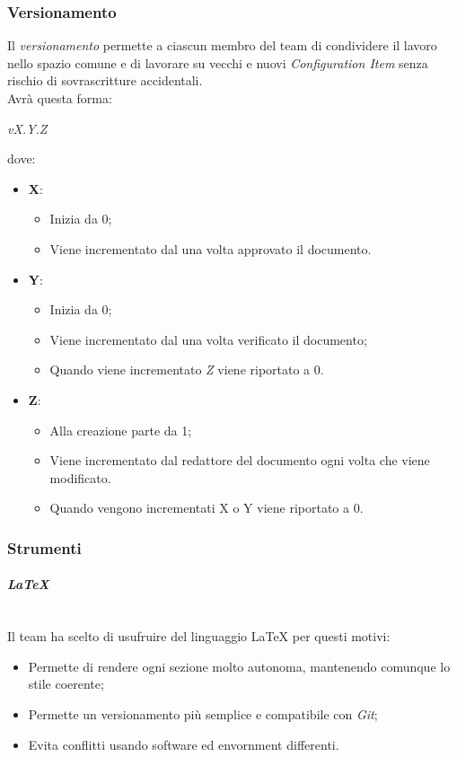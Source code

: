 	\subsubsection{Versionamento}
	Il \emph{versionamento} permette a ciascun membro del team di condividere il lavoro nello spazio comune e di lavorare su vecchi e nuovi \emph{Configuration Item} senza rischio di sovrascritture accidentali.
	\\Avrà questa forma:
	\begin{center}
		\emph{vX.Y.Z}
	\end{center}
	dove:
	\begin{itemize}
		\item \textbf{X}:
		\begin{itemize}
			\item Inizia da 0;
			\item Viene incrementato dal \RdP{} una volta approvato il documento.
		\end{itemize}
		\item \textbf{Y}:
		\begin{itemize}
			\item Inizia da 0;
			\item Viene incrementato dal \ver{} una volta verificato il documento;
			\item Quando viene incrementato \emph{Z} viene riportato a 0.
		\end{itemize}
		\item \textbf{Z}:
		\begin{itemize}
			\item Alla creazione parte da 1;
			\item Viene incrementato dal redattore del documento ogni volta che viene modificato.
			\item Quando vengono incrementati X o Y viene riportato a 0.
		\end{itemize}
	\end{itemize}
	\subsubsection{Strumenti}
			\paragraph{\emph{\LaTeX}}
			~\\Il team ha scelto di usufruire del linguaggio \LaTeX{} per questi motivi:
			\begin{itemize}
				\item Permette di rendere ogni sezione molto autonoma, mantenendo comunque lo stile coerente;
				\item Permette un versionamento più semplice e compatibile con \emph{Git};
				\item Evita conflitti usando software ed envornment differenti.
			\end{itemize}
		
